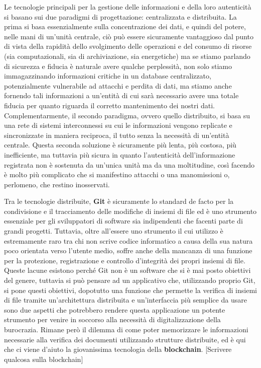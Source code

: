 Le tecnologie principali per la gestione delle informazioni e della loro autenticità
si basano sui due paradigmi di progettazione: centralizzata e distribuita.
La prima si basa essenzialmente sulla concentrazione dei dati, e quindi del potere,
nelle mani di un’unità centrale, ciò può essere sicuramente vantaggioso dal punto di
vista della rapidità dello svolgimento delle operazioni e del consumo di risorse
(sia computazionali, sia di archiviazione, sia energetiche) ma se stiamo parlando di
sicurezza e fiducia è naturale avere qualche perplessità, non solo stiamo immagazzinando
informazioni critiche in un database centralizzato, potenzialmente vulnerabile ad attacchi
e perdita di dati, ma stiamo anche fornendo tali informazioni a un’entità di cui sarà
necessario avere una totale fiducia per quanto riguarda il corretto mantenimento dei
nostri dati. \\
Complementarmente, il secondo paradigma, ovvero quello distribuito, si basa
su una rete di sistemi interconnessi su cui le informazioni vengono replicate e sincronizzate
in maniera reciproca, il tutto senza la necessità di un’entità centrale.
Questa seconda soluzione è sicuramente più lenta, più costosa, più inefficiente,
ma tuttavia più sicura in quanto l’autenticità dell’informazione registrata non è sostenuta
da un’unica unità ma da una moltitudine, così facendo è molto più complicato che si
manifestino attacchi o una manomissioni o, perlomeno, che restino inosservati. 

Tra le tecnologie distribuite, \textbf{Git} è sicuramente lo standard de facto per la condivisione
e il tracciamento delle modifiche di insiemi di file ed è uno strumento essenziale per
gli sviluppatori di software sia indipendenti che facenti parte di grandi progetti.
Tuttavia, oltre all’essere uno strumento il cui utilizzo è estremamente raro tra chi
non scrive codice informatico a causa della sua natura poco orientata verso l’utente medio,
soffre anche della mancanza di una funzione per la protezione, registrazione e controllo
d’integrità dei propri insiemi di file. Queste lacune esistono perché Git non è un software
che si è mai posto obiettivi del genere, tuttavia si può pensare ad un applicativo che,
utilizzando proprio Git, si pone questi obiettivi, dopotutto una funzione che permette
la verifica di insiemi di file tramite un’architettura distribuita e un’interfaccia più
semplice da usare sono due aspetti che potrebbero rendere questa applicazione un potente
strumento per venire in soccorso alla necessità di digitalizzazione della burocrazia.
Rimane però il dilemma di come poter memorizzare le informazioni necessarie alla verifica 
dei documenti utilizzando strutture distribuite, ed è qui che ci viene d’aiuto la giovanissima 
tecnologia della \textbf{blockchain}.
[Scrivere qualcosa sulla blockchain]

